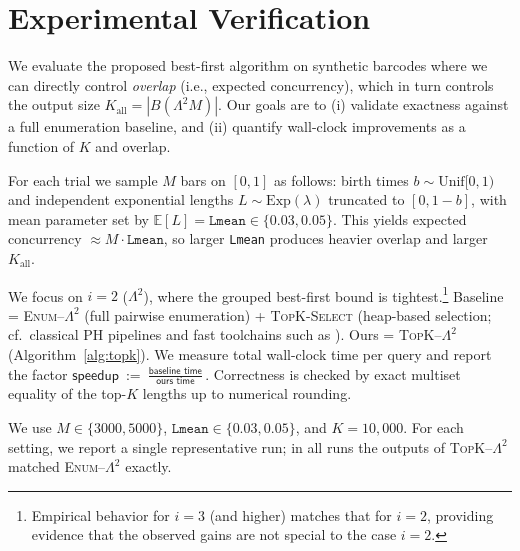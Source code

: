 \documentclass[runningheads]{llncs}
\newcommand{\B}{B}
\newcommand{\Lam}{\Lambda}
\newcommand{\Kc}{K_{\text{all}}}
\begin{document}




\section{Experimental Verification}\label{sec:experiments}

We evaluate the proposed best-first algorithm on synthetic barcodes where we can directly control \emph{overlap} (i.e., expected concurrency), which in turn controls the output size $\Kc=|\B(\Lam^2 M)|$. Our goals are to (i) validate exactness against a full enumeration baseline, and (ii) quantify wall-clock improvements as a function of $K$ and overlap.

For each trial we sample $M$ bars on $[0,1]$ as follows: birth times $b\sim\mathrm{Unif}[0,1)$ and independent exponential lengths $L\sim \mathrm{Exp}(\lambda)$ truncated to $[0,1-b]$, with mean parameter set by $\mathbb{E}[L]=\texttt{Lmean}\in\{0.03,0.05\}$. This yields expected concurrency $\approx M\cdot\texttt{Lmean}$, so larger \texttt{Lmean} produces heavier overlap and larger $\Kc$.

We focus on $i=2$ ($\Lam^2$), where the grouped best-first bound is tightest.\footnote{Empirical behavior for $i=3$ (and higher) matches that for $i=2$, providing evidence that the observed gains are not special to the case $i=2$.}
Baseline = \textsc{Enum--$\Lam^2$} (full pairwise enumeration) + \textsc{TopK-Select} (heap-based selection; cf.\ classical PH pipelines \cite{ELZ02,ZC05} and fast toolchains such as \cite{BauerRipser21}). Ours = \textsc{TopK--$\Lam^2$} (Algorithm~\ref{alg:topk}). We measure total wall-clock time per query and report the factor
$\textsf{speedup} \ := \ \frac{\textsf{baseline time}}{\textsf{ours time}}\,.$
Correctness is checked by exact multiset equality of the top-$K$ lengths up to numerical rounding.

We use $M\in\{3000,5000\}$, $\texttt{Lmean}\in\{0.03,0.05\}$, and $K=10,000$. For each setting, we report a single representative run; in all runs the outputs of \textsc{TopK--$\Lam^2$} matched \textsc{Enum--$\Lam^2$} exactly.
\end{document}
